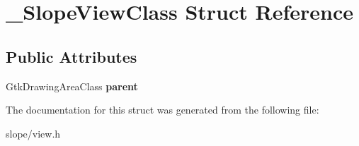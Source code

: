 \hypertarget{struct__SlopeViewClass}{\section{\+\_\+\+Slope\+View\+Class Struct Reference}
\label{struct__SlopeViewClass}
}
\subsection*{Public Attributes}
\begin{DoxyCompactItemize}
\item 
\hypertarget{struct__SlopeViewClass_a169832130ff08b762fd07bc5021c9f56}{Gtk\+Drawing\+Area\+Class {\bfseries parent}}\label{struct__SlopeViewClass_a169832130ff08b762fd07bc5021c9f56}

\end{DoxyCompactItemize}


The documentation for this struct was generated from the following file\+:\begin{DoxyCompactItemize}
\item 
slope/view.\+h\end{DoxyCompactItemize}
